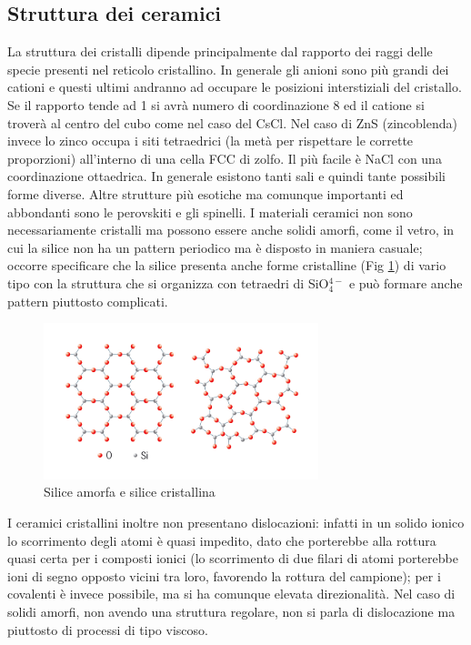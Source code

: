 \subsection{Struttura dei ceramici}

La struttura dei cristalli dipende principalmente dal rapporto dei raggi delle specie presenti nel reticolo cristallino. In generale gli anioni sono più grandi dei cationi e questi ultimi andranno ad occupare le posizioni interstiziali del cristallo. 
Se il rapporto tende ad 1 si avrà numero di coordinazione 8 ed il catione si troverà al centro del cubo come nel caso del CsCl. Nel caso di ZnS (zincoblenda) invece lo zinco occupa i siti tetraedrici (la metà per rispettare le corrette proporzioni) all'interno di una cella FCC di zolfo. Il più facile è NaCl con una coordinazione ottaedrica. In generale esistono tanti sali e quindi tante possibili forme diverse. Altre strutture più esotiche ma comunque importanti ed abbondanti sono le perovskiti e gli spinelli.
I materiali ceramici non sono necessariamente cristalli ma possono essere anche solidi amorfi, come il vetro, in cui la silice non ha un pattern periodico ma è disposto in maniera casuale; occorre specificare che la silice presenta anche forme cristalline (Fig \ref{silice}) di vario tipo con la struttura che si organizza con tetraedri di SiO$_4^{4-}$ e può formare anche pattern piuttosto complicati.

\begin{figure}[h]
    \centering
    \includegraphics[width=8cm]{ceramici/silice.jpg}
    \caption{Silice amorfa e silice cristallina}
    \label{silice}
\end{figure}

I ceramici cristallini inoltre non presentano dislocazioni: infatti in un solido ionico lo scorrimento degli atomi è quasi impedito, dato che porterebbe alla rottura quasi certa per i composti ionici (lo scorrimento di due filari di atomi porterebbe ioni di segno opposto vicini tra loro, favorendo la rottura del campione); per i covalenti è invece possibile, ma si ha comunque elevata direzionalità. Nel caso di solidi amorfi, non avendo una struttura regolare, non si parla di dislocazione ma piuttosto di processi di tipo viscoso.

